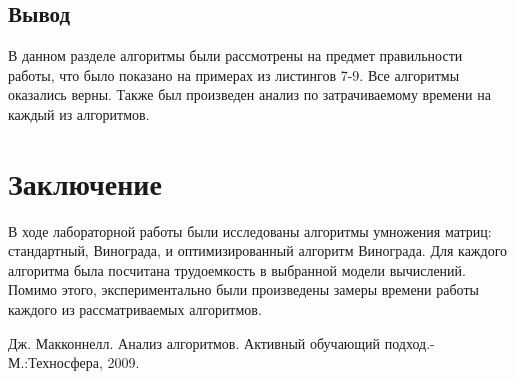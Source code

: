 \documentclass[a4paper, 14pt]{article}
\begin{document}
	\subsection{Вывод}
	В данном разделе алгоритмы были рассмотрены на предмет правильности работы, что было показано на примерах из листингов 7-9. Все алгоритмы оказались верны. Также был произведен анализ по затрачиваемому времени на каждый из алгоритмов.
		

    	\newpage
        \section*{Заключение}
        
        В ходе лабораторной работы были исследованы алгоритмы умножения матриц: стандартный, Винограда, и оптимизированный алгоритм Винограда. Для каждого алгоритма была посчитана трудоемкость в выбранной модели вычислений. Помимо этого, экспериментально были произведены замеры времени работы каждого из рассматриваемых алгоритмов. 
        


    \begin{center}
    	\newpage
        
        \begin{thebibliography}{}
      Дж. Макконнелл. Анализ алгоритмов. Активный обучающий подход.-М.:Техносфера, 2009.
\end{thebibliography}
	
	
	
	
        
    \end{center}        
\end{document}
